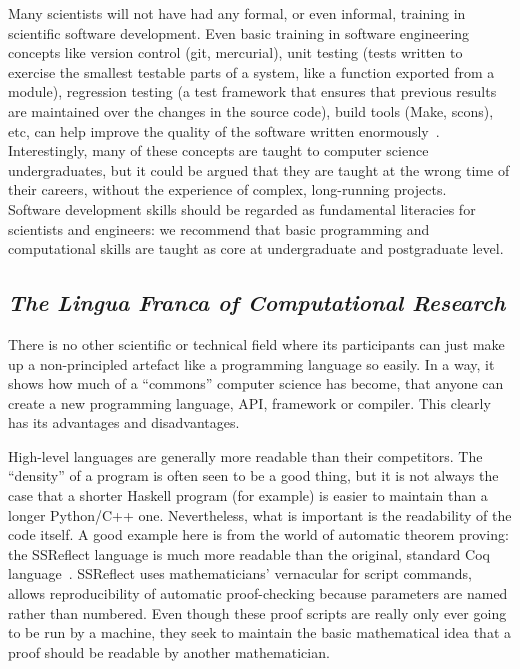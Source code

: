 \documentclass[a4paper,11pt]{article}
\begin{document}
Many scientists will not have had any formal, or even informal,
training in scientific software development. Even basic training in
software engineering concepts like version control (git, mercurial),
unit testing (tests written to exercise the smallest testable parts of
a system, like a function exported from a module), regression testing
(a test framework that ensures that previous results are maintained
over the changes in the source code), build tools (Make, scons), etc,
can help improve the quality of the software written
enormously~\cite{wilson2006}.  Interestingly, many of these concepts
are taught to computer science undergraduates, but it could be argued
that they are taught at the wrong time of their careers, without the
experience of complex,
long-running projects.\\

 Software
development skills should be regarded as fundamental literacies for
scientists and engineers: we recommend that basic programming and
computational skills are taught as core at undergraduate and
postgraduate level.

\subsection{{\emph{The Lingua Franca of Computational Research}}}

There is no other scientific or technical field where its participants
can just make up a non-principled artefact like a programming language
so easily. In a way, it shows how much of a ``commons'' computer
science has become, that anyone can create a new programming language,
API, framework or compiler. This clearly has its advantages and
disadvantages.

High-level languages are generally more readable than their
competitors. The ``density'' of a program is often seen to be a good
thing, but it is not always the case that a shorter Haskell program
(for example) is easier to maintain than a longer Python/C++
one. Nevertheless, what is important is the readability of the code
itself. A good example here is from the world of automatic theorem
proving: the SSReflect language is much more readable than the
original, standard Coq language~\cite{GonthierZND13}. SSReflect uses
mathematicians' vernacular for script commands, allows reproducibility
of automatic proof-checking because parameters are named rather than
numbered.  Even though these proof scripts are really only ever going
to be run by a machine, they seek to maintain the basic mathematical
idea that a proof should be readable by another mathematician.
\end{document}
